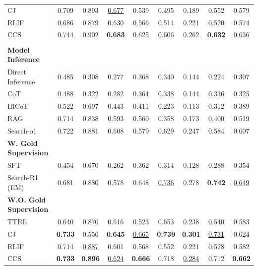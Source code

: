 \begin{table}[htbp]
{\begin{tabular}{lcccccccc}
\hspace{1em}CJ & 0.709 & 0.893 & \underline{0.677} & 0.539 & 0.495 & 0.189 & 0.552 & 0.579 \\
\hspace{1em}RLIF & 0.686 & 0.879 & 0.630 & 0.566 & 0.514 & 0.221 & 0.520 & 0.574 \\
\hspace{1em}CCS & \underline{0.744} & \underline{0.902} & \textbf{0.683} & \underline{0.625} & \underline{0.606} & \underline{0.262} & \textbf{0.632} & \underline{0.636} \\
\midrule
\rowcolor{gray!10}
\multicolumn{9}{c}{\textbf{\textit{Qwen3-32B}}} \\
\textbf{Model Inference} & & & & & & & & \\
\hspace{1em}Direct Inference & 0.485 & 0.308 & 0.277 & 0.368 & 0.340 & 0.144 & 0.224 & 0.307 \\
\hspace{1em}CoT & 0.488 & 0.322 & 0.282 & 0.364 & 0.338 & 0.144 & 0.336 & 0.325 \\
\hspace{1em}IRCoT & 0.522 & 0.697 & 0.443 & 0.411 & 0.223 & 0.113 & 0.312 & 0.389 \\
\hspace{1em}RAG & 0.714 & 0.838 & 0.593 & 0.560 & 0.358 & 0.173 & 0.400 & 0.519 \\
\hspace{1em}Search-o1 & 0.722 & 0.881 & 0.608 & 0.579 & 0.629 & 0.247 & 0.584 & 0.607 \\
\textbf{W. Gold Supervision} & & & & & & & & \\
\hspace{1em}SFT & 0.454 & 0.670 & 0.262 & 0.362 & 0.314 & 0.128 & 0.288 & 0.354 \\
\hspace{1em}Search-R1 (EM) & 0.681 & 0.880 & 0.578 & 0.648 & \underline{0.736} & 0.278 & \textbf{0.742} & \underline{0.649} \\
\textbf{W.O. Gold Supervision} & & & & & & & & \\
\hspace{1em}TTRL & 0.640 & 0.870 & 0.616 & 0.523 & 0.653 & 0.238 & 0.540 & 0.583 \\
\hspace{1em}CJ & \textbf{0.733} & 0.556 & \textbf{0.645} & \underline{0.665} & \textbf{0.739} & \textbf{0.301} & \underline{0.731} & 0.624 \\
\hspace{1em}RLIF & 0.714 & \underline{0.887} & 0.601 & 0.568 & 0.552 & 0.221 & 0.528 & 0.582 \\
\hspace{1em}CCS & \textbf{0.733} & \textbf{0.896} & \underline{0.624} & \textbf{0.666} & 0.718 & \underline{0.284} & 0.712 & \textbf{0.662} \\
\bottomrule
\end{tabular}
}
\label{tbl:main}
\end{table}